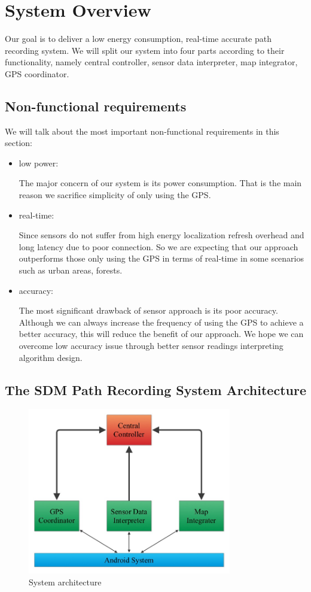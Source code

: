 \documentclass[journal]{IEEEtran}
\begin{document}
\section{System Overview}
Our goal is to deliver a low energy consumption, real-time accurate path recording system.
We will split our system into four parts according to their functionality, namely central controller, sensor data interpreter, map integrator, GPS coordinator.

\subsection{Non-functional requirements}
We will talk about the most important non-functional requirements in this section:

\begin{itemize}
	\item low power: 

		The major concern of our system is its power consumption. That is the main reason we sacrifice simplicity of only using the GPS.
	\item real-time: 

		Since sensors do not suffer from high energy localization refresh overhead and long latency due to poor connection. 
		So we are expecting that our approach outperforms those only using the GPS in terms of real-time in some scenarios such as urban areas, forests.
	\item accuracy: 

		The most significant drawback of sensor approach is its poor accuracy. 
		Although we can always increase the frequency of using the GPS to achieve a better accuracy, this will reduce the benefit of our approach.
		We hope we can overcome low accuracy issue through better sensor readings interpreting algorithm design.
\end{itemize}

\subsection{The SDM Path Recording System Architecture}
\begin{figure}
	\centering
	\includegraphics[width=3.5in]{figures/sysArc}
	\caption{System architecture}
\end{figure}
\end{document}
